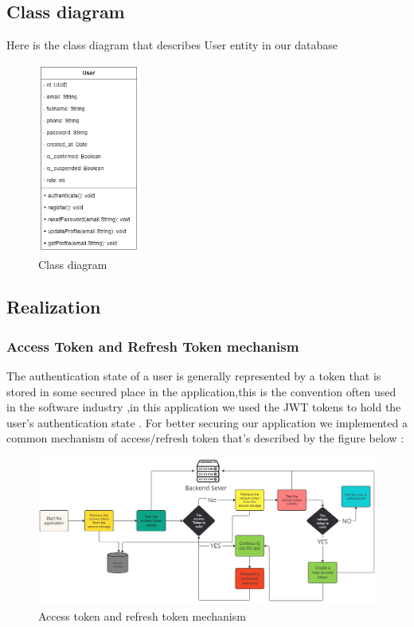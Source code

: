 \subsection{Class diagram }
Here is the class diagram that describes User entity in our database
\begin{figure}[H]
\begin{center}
    
\includegraphics[width=0.3\textwidth]{images/chap2/userClass.png}
    \caption{Class diagram}
    \label{fig:enter-label} 
\end{center}
\end{figure}
% 
% 
% 
\subsection{Realization}
\subsubsection{Access Token and Refresh Token mechanism}
The authentication state of a user is generally represented by a token that is stored in some secured place in the application,this is the convention often used in the software industry ,in this application we used the JWT tokens to hold the user's authentication state .
For better securing our application we implemented a common mechanism of access/refresh token that's described by the figure below :
\begin{figure}[H]
\includegraphics[width=1\textwidth]{images/chap2/refTkn.jpg}
    \caption{Access token and refresh token mechanism}
    \label{fig:enter-label}
\end{figure}
